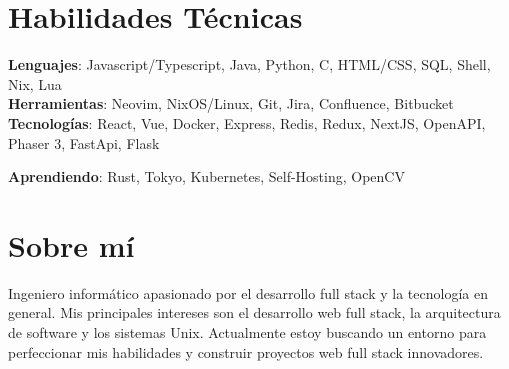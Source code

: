 \documentclass[letterpaper,11pt]{article}
\begin{document}
\section{\Large Habilidades Técnicas}
 \begin{itemize}[leftmargin=0.15in, label={}]
    \small{\item{
     \textbf{Lenguajes}{: Javascript/Typescript, Java, Python, C, HTML/CSS, SQL, Shell, Nix, Lua} \\
     \textbf{Herramientas}{: Neovim, NixOS/Linux, Git, Jira, Confluence, Bitbucket} \\
     \textbf{Tecnologías}{: React, Vue, Docker, Express, Redis, Redux, NextJS, OpenAPI, Phaser 3, FastApi, Flask} \\
    }}
     \textbf{Aprendiendo}{: Rust, Tokyo, Kubernetes, Self-Hosting, OpenCV} \\
 \end{itemize}
 \vspace{-10pt}


 \section{\Large Sobre mí}
  Ingeniero informático apasionado por el desarrollo full stack y la tecnología en general. Mis principales intereses son el desarrollo web full stack, la arquitectura de software y los sistemas Unix. Actualmente estoy buscando un entorno para perfeccionar mis habilidades y construir proyectos web full stack innovadores.
\end{document}
